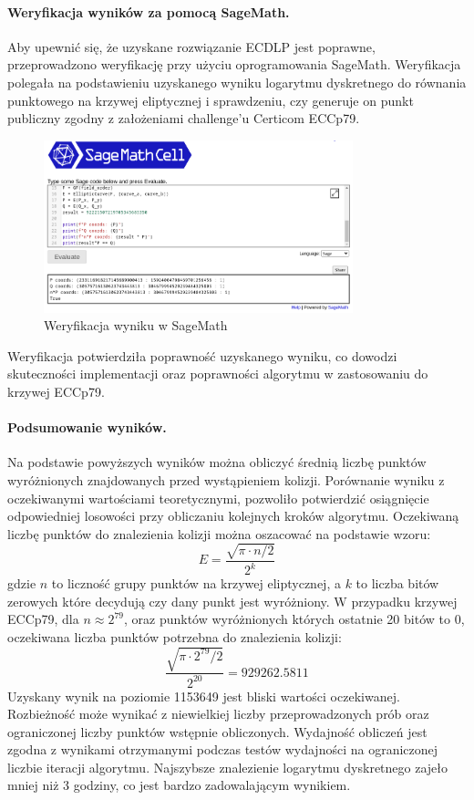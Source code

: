 \paragraph{Weryfikacja wyników za pomocą SageMath.}
Aby upewnić się, że uzyskane rozwiązanie ECDLP jest poprawne, przeprowadzono
weryfikację przy użyciu oprogramowania SageMath. Weryfikacja polegała na
podstawieniu uzyskanego wyniku logarytmu dyskretnego do równania punktowego
na krzywej eliptycznej i sprawdzeniu, czy generuje on punkt publiczny
zgodny z założeniami challenge'u Certicom ECCp79.
\begin{figure}[H]
    \centering
    \includegraphics[width=0.8\textwidth]{img/sage_check_full.png}
    \caption{Weryfikacja wyniku w SageMath}
    \label{fig:sage_verification}
\end{figure}

Weryfikacja potwierdziła poprawność uzyskanego wyniku, co dowodzi skuteczności
implementacji oraz poprawności algorytmu w zastosowaniu do krzywej ECCp79.

\paragraph{Podsumowanie wyników.}
Na podstawie powyższych wyników można obliczyć średnią liczbę punktów wyróżnionych
znajdowanych przed wystąpieniem kolizji.
Porównanie wyniku z oczekiwanymi wartościami teoretycznymi, pozwoliło potwierdzić
osiągnięcie odpowiedniej losowości przy obliczaniu kolejnych kroków algorytmu.
Oczekiwaną liczbę punktów do znalezienia kolizji można oszacować na podstawie wzoru:
$$
    E = \frac{\sqrt{\pi \cdot n / 2}}{2^k}
$$
gdzie $n$ to liczność grupy punktów na krzywej eliptycznej, a $k$ to liczba bitów zerowych które decydują
czy dany punkt jest wyróżniony. W przypadku krzywej ECCp79,
dla $n \approx 2^{79}$, oraz punktów wyróżnionych których ostatnie 20 bitów to $0$, oczekiwana liczba
punktów potrzebna do znalezienia kolizji:
$$
    \frac{\sqrt{\pi \cdot 2^{79} / 2}}{2^{20}} = 929262.5811
$$
Uzyskany wynik na poziomie 1153649 jest bliski wartości oczekiwanej. Rozbieżność może wynikać z niewielkiej
liczby przeprowadzonych prób oraz ograniczonej liczby punktów wstępnie obliczonych.
Wydajność obliczeń jest zgodna z wynikami otrzymanymi podczas testów wydajności na ograniczonej liczbie iteracji algorytmu.
Najszybsze znalezienie logarytmu dyskretnego zajeło mniej niż 3 godziny, co jest bardzo zadowalającym wynikiem.

